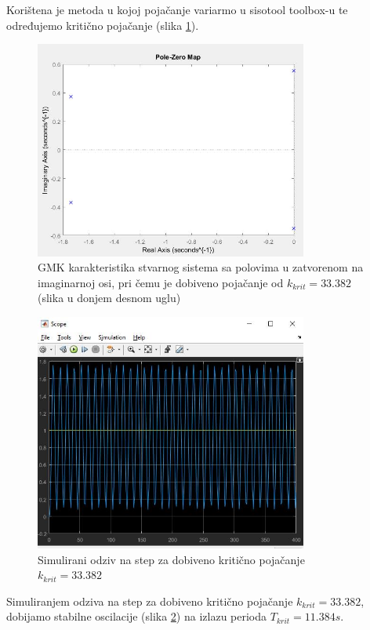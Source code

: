 Korištena je metoda u kojoj pojačanje variarmo u sisotool toolbox-u te određujemo kritično pojačanje (slika \ref{fig:z1_10}).

\begin{figure} [H]
  \centering
  \includegraphics[width=0.8\textwidth]{z1_10}
  \caption{GMK karakteristika stvarnog sistema sa polovima u zatvorenom na imaginarnoj osi, pri čemu je dobiveno pojačanje od $k_{krit}=33.382$ (slika u donjem desnom uglu)}
  \label{fig:z1_10}
\end{figure}

\begin{figure} [H]
  \centering
  \includegraphics[width=0.8\textwidth]{z1_11}
  \caption{Simulirani odziv na step za dobiveno kritično pojačanje $k_{krit}=33.382$}
  \label{fig:z1_11}
\end{figure}

Simuliranjem odziva na step za dobiveno kritično pojačanje $k_{krit}=33.382$, dobijamo stabilne oscilacije (slika \ref{fig:z1_11}) na izlazu perioda $T_{krit}=11.384s$.

